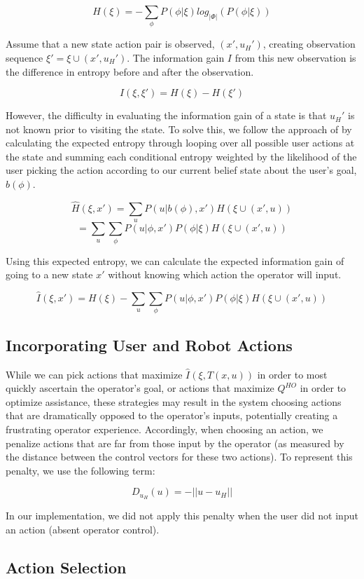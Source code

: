 \documentclass[conference]{IEEEtran}
\begin{document}
\[
H(\xi) = -\sum_\phi P(\phi|\xi)log_{|\Phi|}(P(\phi|\xi))
\]

Assume that a new state action pair is observed, $(x',u_H')$, creating observation sequence $\xi' = \xi \cup (x', u_H')$. The information gain $I$ from this new observation is the difference in entropy before and after the observation.

\[
I(\xi, \xi') = H(\xi) - H(\xi')
\]

However, the difficulty in evaluating the information gain of a state is that $u_H'$ is not known prior to visiting the state. To solve this, we follow the approach of \citet{holub2008entropy} by calculating the expected entropy through looping over all possible user actions at the state and summing each conditional entropy weighted by the likelihood of the user picking the action according to our current belief state about the user's goal, $b(\phi)$.

\[
\hat{H}(\xi, x') = \sum_u P(u|b(\phi),x')H(\xi \cup (x', u))
\]
\[
= \sum_u \sum_\phi P(u|\phi,x')P(\phi|\xi)H(\xi \cup (x', u))
\]

Using this expected entropy, we can calculate the expected information gain of going to a new state $x'$ without knowing which action the operator will input.

\[
\hat{I}(\xi, x') = H(\xi) - \sum_u \sum_\phi P(u|\phi,x')P(\phi|\xi)H(\xi \cup (x', u))
\]

\subsection{Incorporating User and Robot Actions}
While we can pick actions that maximize $\hat{I}(\xi, T(x,u))$ in order to most quickly ascertain the operator's goal, or actions that maximize $Q^{HO}$ in order to optimize assistance, these strategies may result in the system choosing actions that are dramatically opposed to the operator's inputs, potentially creating a frustrating operator experience. Accordingly, when choosing an action, we penalize actions that are far from those input by the operator (as measured by the distance between the control vectors for these two actions). To represent this penalty, we use the following term:

\[
D_{u_H}(u) = -||u - u_H||
\]

In our implementation, we did not apply this penalty when the user did not input an action (absent operator control).

\subsection{Action Selection}
\end{document}
